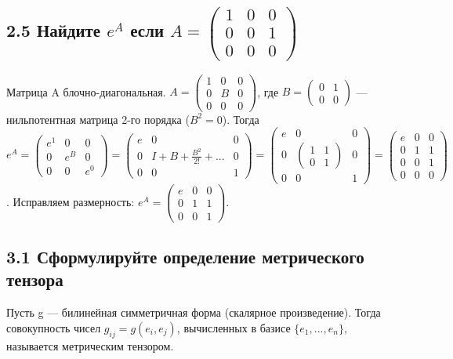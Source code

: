 \documentclass{article}
\begin{document}
\subsection*{2.5 Найдите \( e^A \) если \( A = \begin{pmatrix} 1 & 0 & 0 \\ 0 & 0 & 1 \\ 0 & 0 & 0 \end{pmatrix} \)}
Матрица A блочно-диагональная. \( A = \begin{pmatrix} 1 & 0 & 0 \\ 0 & B & 0 \\ 0 & 0 & 0 \end{pmatrix} \), где \( B = \begin{pmatrix} 0 & 1 \\ 0 & 0 \end{pmatrix} \) — нильпотентная матрица 2-го порядка (\(B^2=0\)).
Тогда \( e^A = \begin{pmatrix} e^1 & 0 & 0 \\ 0 & e^B & 0 \\ 0 & 0 & e^0 \end{pmatrix} = \begin{pmatrix} e & 0 & 0 \\ 0 & I + B + \frac{B^2}{2!} + ... & 0 \\ 0 & 0 & 1 \end{pmatrix} = \begin{pmatrix} e & 0 & 0 \\ 0 & \begin{pmatrix} 1 & 1 \\ 0 & 1 \end{pmatrix} & 0 \\ 0 & 0 & 1 \end{pmatrix} = \begin{pmatrix} e & 0 & 0 \\ 0 & 1 & 1 \\ 0 & 0 & 1 \\ 0 & 0 & 0 \end{pmatrix} \). Исправляем размерность: \( e^A = \begin{pmatrix} e & 0 & 0 \\ 0 & 1 & 1 \\ 0 & 0 & 1 \end{pmatrix} \).

\subsection*{3.1 Сформулируйте определение метрического тензора}
Пусть g — билинейная симметричная форма (скалярное произведение). Тогда совокупность чисел \(g_{ij} = g(e_i, e_j)\), вычисленных в базисе \(\{e_1, ..., e_n\}\), называется метрическим тензором.
\end{document}
